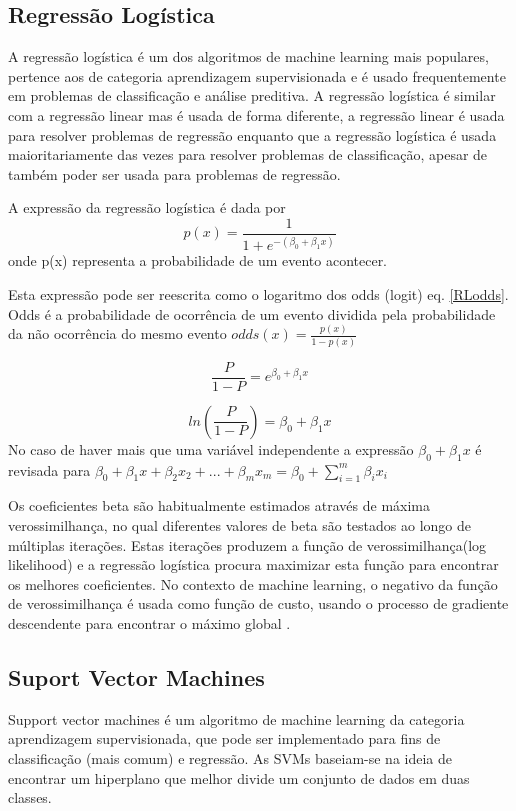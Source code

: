 \subsection{Regressão Logística}

A regressão logística é um dos algoritmos de machine learning mais populares, pertence aos de categoria aprendizagem supervisionada e é usado frequentemente em problemas de classificação e análise preditiva. A regressão logística é similar com a regressão linear mas é usada de forma diferente, a regressão linear é usada para resolver problemas de regressão enquanto que a regressão logística é usada maioritariamente das vezes para resolver problemas de classificação, apesar de também poder ser usada para problemas de regressão.

A expressão da regressão logística é dada por
\begin{equation}
\mathit{p} (x) =\frac{1}{1+e^{-(\beta _{0} + \beta _{1}x)}}
\end{equation}
onde p(x) representa a probabilidade de um evento acontecer.

Esta expressão pode ser reescrita como o logaritmo dos odds (logit) eq. \ref{RLodds}. Odds é a probabilidade de ocorrência de um evento dividida pela probabilidade da não ocorrência do mesmo evento $odds(x) = \frac{p(x)}{1-p(x)}$


\begin{equation}
\frac{P}{1 - P} = e^{\beta _{0} + \beta _{1}x}
\end{equation}

\begin{equation}
ln(\frac{P}{1 - P}) = \beta _{0} + \beta _{1}x
\label{RLodds}
\end{equation}
No caso de haver mais que uma variável independente a expressão $\beta _{0} + \beta _{1}x$  é revisada para $\beta _{0} + \beta _{1}x + \beta _{2}x_2 +...+\beta _{m}x_m = \beta _{0} + \sum_{i=1}^{m} \beta_{i}x_i $

Os coeficientes beta são habitualmente estimados através de máxima verossimilhança, no qual diferentes valores de beta são testados ao longo de múltiplas iterações. Estas iterações produzem a função de verossimilhança(log likelihood) e a regressão logística procura maximizar esta função para encontrar os melhores coeficientes. No contexto de machine learning, o negativo da função de verossimilhança é usada como função de custo, usando o processo de gradiente descendente para encontrar o máximo global \cite{logReg}.

\subsection{Suport Vector Machines}
Support vector machines é um algoritmo de machine learning da categoria aprendizagem supervisionada, que pode ser implementado para fins de classificação (mais comum) e regressão. As SVMs baseiam-se na ideia de encontrar um hiperplano que melhor divide um conjunto de dados em duas classes.

